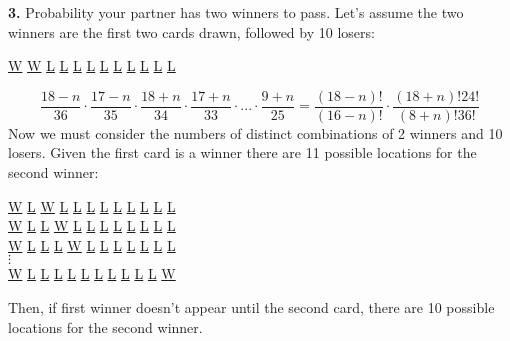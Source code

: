 \documentclass[11pt]{article}
\begin{document}
\textbf{3.} Probability your partner has two winners to pass. Let's assume the two winners are the first two cards drawn, followed by 10 losers:\\
\begin {center}
\underline{W} \underline{W} \underline{L} \underline{L} \underline{L} \underline{L} \underline{L} \underline{L} \underline{L} \underline{L} \underline{L} \underline{L}
\end {center}
\begin {equation}
\frac{18-n}{36}\cdot \frac{17-n}{35}\cdot \frac{18+n}{34} \cdot \frac{17+n}{33}\cdot ...\cdot \frac {9+n}{25}=\frac{(18-n)!}{(16-n)!}\cdot \frac{(18+n)!24!}{(8+n)!36!}
\end{equation}
Now we must consider the numbers of distinct combinations of 2 winners and 10 losers. Given the first card is a winner there are 11 possible locations for the second winner:
\begin {center}
  \underline{W} \underline{L} \underline{W} \underline{L} \underline{L} \underline{L} \underline{L} \underline{L} \underline{L} \underline{L} \underline{L} \underline{L}\\
  \underline{W} \underline{L} \underline{L} \underline{W} \underline{L} \underline{L} \underline{L} \underline{L} \underline{L} \underline{L} \underline{L} \underline{L}\\
  \underline{W} \underline{L} \underline{L} \underline{L} \underline{W} \underline{L} \underline{L} \underline{L} \underline{L} \underline{L} \underline{L} \underline{L}\\
 $\vdots$ \\
   \underline{W} \underline{L} \underline{L} \underline{L} \underline{L} \underline{L} \underline{L} \underline{L} \underline{L} \underline{L} \underline{L} \underline{W}\\
\end {center}
Then, if first winner doesn't appear until the second card, there are 10 possible locations for the second winner. 
\end{document}
